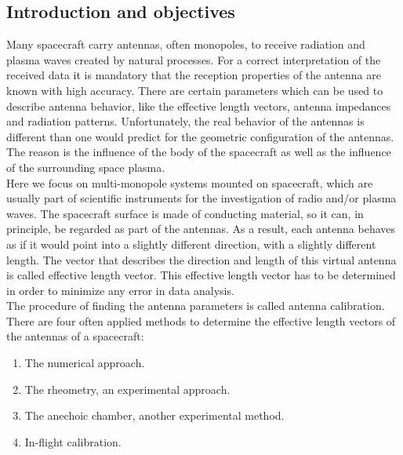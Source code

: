 \documentclass[draft,ras]{agutex}
\begin{document}
%
%

%


\begin{article}
\section{Introduction and objectives}
Many spacecraft carry antennas, often monopoles, to receive radiation and plasma waves created by natural processes. For a correct interpretation of the received data it is mandatory that the reception properties of the antenna are known with high accuracy. There are certain parameters which can be used to describe antenna behavior, like the effective length vectors, antenna impedances and radiation patterns. Unfortunately, the real behavior of the antennas is different than one would predict for the geometric configuration of the antennas. The reason is the influence of the body of the spacecraft as well as the influence of the surrounding space plasma.\\

Here we focus on multi-monopole systems mounted on spacecraft, which are usually part of scientific instruments for the investigation of radio and/or plasma waves. The spacecraft surface is made of conducting material, so it can, in principle, be regarded as part of the antennas. As a result, each antenna behaves as if it would point into a slightly different direction, with a slightly different length. The vector that describes the direction and length of this virtual antenna is called effective length vector. This effective length vector has to be determined in order to minimize any error in data analysis.\\

The procedure of finding the antenna parameters is called antenna calibration. There are four often applied methods to determine the effective length vectors of the antennas of a spacecraft:

\begin{enumerate}
\item The numerical approach.
\item The rheometry, an experimental approach.
\item The anechoic chamber, another experimental method.
\item In-flight calibration.
\end{enumerate}


\end{article}
\end{document}
